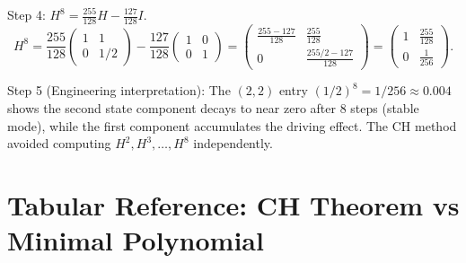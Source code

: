 \documentclass[12pt,a4paper]{article}
\begin{document}
Step 4: $H^{8} = \tfrac{255}{128}H - \tfrac{127}{128}I$.
\[
  H^{8} = \frac{255}{128}\begin{pmatrix}1&1\\0&1/2\end{pmatrix}
          - \frac{127}{128}\begin{pmatrix}1&0\\0&1\end{pmatrix}
        = \begin{pmatrix}\frac{255-127}{128} & \frac{255}{128} \\ 0 & \frac{255/2-127}{128}\end{pmatrix}
        = \begin{pmatrix}1 & \frac{255}{128} \\ 0 & \frac{1}{256}\end{pmatrix}.
\]

Step 5 (Engineering interpretation): The $(2,2)$ entry $(1/2)^{8}=1/256\approx 0.004$
shows the second state component decays to near zero after 8 steps
(stable mode), while the first component accumulates the driving effect.
The CH method avoided computing $H^{2},H^{3},\ldots,H^{8}$ independently.

\section{Tabular Reference: CH Theorem vs Minimal Polynomial}
\end{document}
